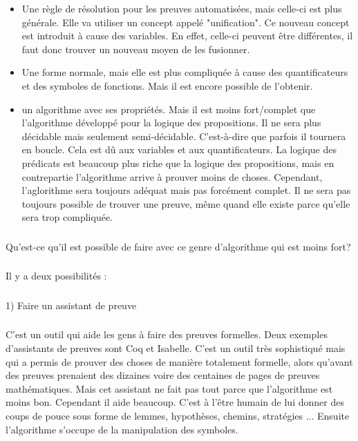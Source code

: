 \begin{itemize}

  \item Une règle de résolution pour les preuves automatisées, mais celle-ci est plus générale. Elle va utiliser un concept appelé "unification". Ce nouveau concept est introduit à cause des variables. En effet, celle-ci peuvent être différentes, il faut donc trouver un nouveau moyen de les fusionner.
  \item Une forme normale, mais elle est plus compliquée à cause des quantificateurs et des symboles de fonctions. Mais il est encore possible de l'obtenir.
  \item un algorithme avec ses propriétés. Mais il est moins fort/complet que l'algorithme développé pour la logique des propositions. Il ne sera plus décidable mais seulement semi-décidable. C'est-à-dire que parfois il tournera en boucle. Cela est dû aux variables et aux quantificateurs. La logique des prédicats est beaucoup plus riche que la logique des propositions, mais en contrepartie l'algorithme arrive à prouver moins de choses. Cependant, l'aglorithme sera toujours adéquat mais pas forcément complet. Il ne sera pas toujours possible de trouver une preuve, même quand elle existe parce qu'elle sera trop compliquée.

\end{itemize}

\subsubsection{}
Qu'est-ce qu'il est possible de faire avec ce genre d'algorithme qui est moins fort?

\subsubsection{}
Il y a deux possibilités : 
\subsubsection{}

1) Faire un assistant de preuve

\subsubsection{}
    C'est un outil qui aide les gens à faire des preuves formelles. Deux exemples d'assistants de preuves sont Coq et Isabelle. C'est un outil très sophistiqué mais qui a permis de prouver des choses de manière totalement formelle, alors qu'avant des preuves prenaient des dizaines voire des centaines de pages de preuves mathématiques. Mais cet assistant ne fait pas tout parce que l'algorithme est moins bon. Cependant il aide beaucoup. C'est à l'être humain de lui donner des coups de pouce sous forme de lemmes, hypothèses, chemins, stratégies ... Ensuite l'algorithme s'occupe de la manipulation des symboles.
